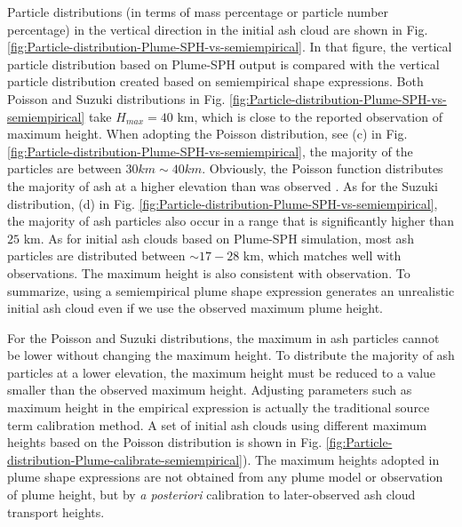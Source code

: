 \documentclass[utf8]{frontiersSCNS} %
\begin{document}
Particle distributions (in terms of mass percentage or particle number percentage) in the vertical direction in the initial ash cloud are shown in Fig. \ref{fig:Particle-distribution-Plume-SPH-vs-semiempirical}. In that figure, the vertical particle distribution based on Plume-SPH output is compared with the vertical particle distribution created based on semiempirical shape expressions. Both Poisson and Suzuki distributions in Fig. \ref{fig:Particle-distribution-Plume-SPH-vs-semiempirical} take $H_{max} = 40$ km, which is close to the reported observation of maximum height. When adopting the Poisson distribution, see (c) in  Fig. \ref{fig:Particle-distribution-Plume-SPH-vs-semiempirical}, the majority of the particles are between $30 km \sim 40 km$. Obviously, the Poisson function distributes the majority of ash at a higher elevation than was observed \citep[e.g.][]{fero2008simulation}. As for the Suzuki distribution, (d) in  Fig. \ref{fig:Particle-distribution-Plume-SPH-vs-semiempirical}, the majority of ash particles also occur in a range that is significantly higher than $25 $ km. As for initial ash clouds based on Plume-SPH simulation, most ash particles are distributed between $\sim 17-  28$ km, which matches well with observations. The maximum height is also consistent with observation. To summarize, using a semiempirical plume shape expression generates an unrealistic initial ash cloud even if we use the observed maximum plume height.

For the Poisson and Suzuki distributions, the maximum in ash particles cannot be lower without changing the maximum height. To distribute the majority of ash particles at a lower elevation, the maximum height must be reduced to a value smaller than the observed maximum height. Adjusting parameters such as maximum height in the empirical expression is actually the traditional source term calibration method. A set of initial ash clouds using different maximum heights based on the Poisson distribution is shown in Fig. \ref{fig:Particle-distribution-Plume-calibrate-semiempirical}). The maximum heights adopted in plume shape expressions are not obtained from any plume model or observation of plume height, but by \textit{a posteriori} calibration to later-observed ash cloud transport heights.
\end{document}

